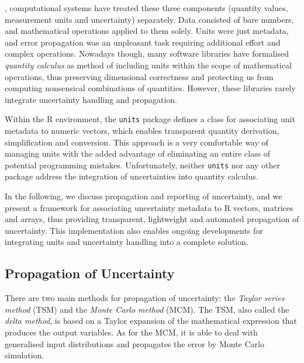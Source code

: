 \documentclass[twoside,nohyper]{tufte-book}
\theoremstyle{definition}
\theoremstyle{definition}
\theoremstyle{definition}
\theoremstyle{remark}
\begin{document}
, computational systems have treated these
three components (quantity values, measurement units and uncertainty)
separately. Data consisted of bare numbers, and mathematical operations
applied to them solely. Units were just metadata, and error propagation
was an unpleasant task requiring additional effort and complex
operations. Nowadays though, many software libraries have formalised
\emph{quantity calculus} as method of including units within the scope
of mathematical operations, thus preserving dimensional correctness and
protecting us from computing nonsensical combinations of quantities.
However, these libraries rarely integrate uncertainty handling and
propagation\cite[-15mm]{Flatter:2018}.

Within the R environment, the \texttt{units}
package\cite[0pt]{CRAN:units,Pebesma:2016:units}
defines a class for associating unit metadata to numeric vectors, which
enables transparent quantity derivation, simplification and conversion.
This approach is a very comfortable way of managing units with the added
advantage of eliminating an entire class of potential programming
mistakes. Unfortunately, neither \texttt{units} nor any other package
address the integration of uncertainties into quantity calculus.

In the following, we discuss propagation and reporting of uncertainty,
and we present a framework for associating uncertainty metadata to R
vectors, matrices and arrays, thus providing transparent, lightweight
and automated propagation of uncertainty. This implementation also
enables ongoing developments for integrating units and uncertainty
handling into a complete solution.

\subsection{Propagation of
Uncertainty}\label{propagation-of-uncertainty}

There are two main methods for propagation of uncertainty: the
\emph{Taylor series method} (TSM) and the \emph{Monte Carlo method}
(MCM). The TSM, also called the \emph{delta method}, is based on a
Taylor expansion of the mathematical expression that produces the output
variables. As for the MCM, it is able to deal with generalised input
distributions and propagates the error by Monte Carlo simulation.
\end{document}
